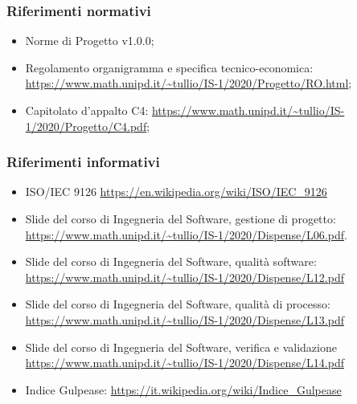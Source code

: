 \documentclass[../piano_di_qualifica.tex]{subfiles}
\begin{document}
\subsubsection{Riferimenti normativi}
\begin{itemize}
	\item Norme di Progetto v1.0.0;
	\item Regolamento organigramma e specifica tecnico-economica: \url{https://www.math.unipd.it/~tullio/IS-1/2020/Progetto/RO.html};
	\item Capitolato d’appalto C4: \url{https://www.math.unipd.it/~tullio/IS-1/2020/Progetto/C4.pdf};
\end{itemize}

\subsubsection{Riferimenti informativi}

\begin{itemize}
	\item ISO/IEC 9126 \url{https://en.wikipedia.org/wiki/ISO/IEC_9126}
	\item Slide del corso di Ingegneria del Software, gestione di progetto: \url{https://www.math.unipd.it/~tullio/IS-1/2020/Dispense/L06.pdf}.
	\item Slide del corso di Ingegneria del Software, qualità software: \url{https://www.math.unipd.it/~tullio/IS-1/2020/Dispense/L12.pdf}
	\item Slide del corso di Ingegneria del Software, qualità di processo: \url{https://www.math.unipd.it/~tullio/IS-1/2020/Dispense/L13.pdf}
	\item Slide del corso di Ingegneria del Software, verifica e validazione \url{https://www.math.unipd.it/~tullio/IS-1/2020/Dispense/L14.pdf}
	\item Indice Gulpease: \url{https://it.wikipedia.org/wiki/Indice_Gulpease}
\end{itemize}
\end{document}
